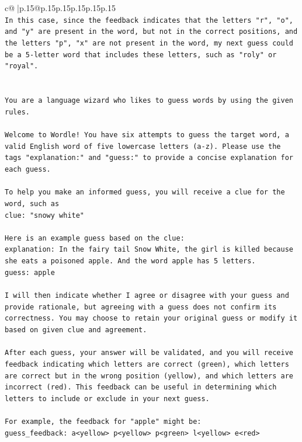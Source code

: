 \documentclass{article}
\begin{document}
{\begin{supertabular}{c@{$\;$}|p{.15\linewidth}@{}p{.15\linewidth}p{.15\linewidth}p{.15\linewidth}p{.15\linewidth}p{.15\linewidth}}
{{{\\ 
\texttt{In this case, since the feedback indicates that the letters "r", "o", and "y" are present in the word, but not in the correct positions, and the letters "p", "x" are not present in the word, my next guess could be a 5{-}letter word that includes these letters, such as "roly" or "royal".} \\
\\ 
\\ 
\texttt{You are a language wizard who likes to guess words by using the given rules.} \\
\\ 
\texttt{Welcome to Wordle! You have six attempts to guess the target word, a valid English word of five lowercase letters (a{-}z). Please use the tags "explanation:" and "guess:" to provide a concise explanation for each guess.} \\
\\ 
\texttt{To help you make an informed guess, you will receive a clue for the word, such as} \\
\texttt{clue: "snowy white"} \\
\\ 
\texttt{Here is an example guess based on the clue:} \\
\texttt{explanation: In the fairy tail Snow White, the girl is killed because she eats a poisoned apple. And the word apple has 5 letters.} \\
\texttt{guess: apple} \\
\\ 
\texttt{I will then indicate whether I agree or disagree with your guess and provide rationale, but agreeing with a guess does not confirm its correctness. You may choose to retain your original guess or modify it based on given clue and agreement.} \\
\\ 
\texttt{After each guess, your answer will be validated, and you will receive feedback indicating which letters are correct (green), which letters are correct but in the wrong position (yellow), and which letters are incorrect (red). This feedback can be useful in determining which letters to include or exclude in your next guess.} \\
\\ 
\texttt{For example, the feedback for "apple" might be:} \\
\texttt{guess\_feedback: a<yellow> p<yellow> p<green> l<yellow> e<red>} \\
\\ 
}}}
\end{supertabular}}
\end{document}
